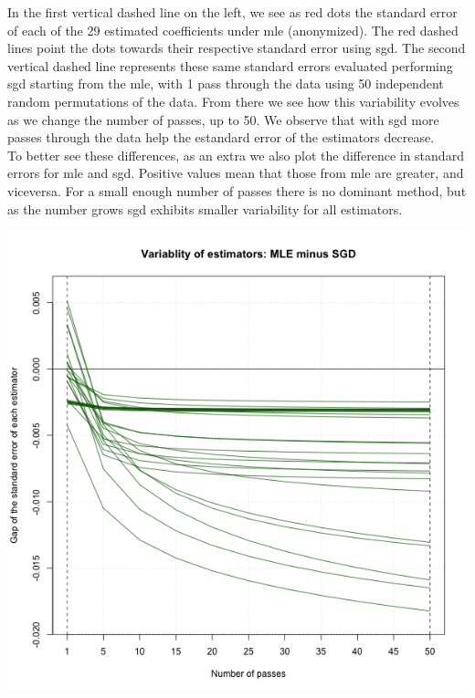 \documentclass[a4paper, 11pt]{article}
\begin{document}
In the first vertical dashed line on the left, we see as red dots the standard error of each of the 29 estimated coefficients under {\sc mle} (anonymized). The red dashed lines point the dots towards their respective standard error using {\sc sgd}. The second vertical dashed line represents these same standard errors evaluated performing {\sc sgd} starting from the {\sc mle}, with 1 pass through the data using 50 independent random permutations of the data. From there we see how this variability evolves as we change the number of passes, up to 50. We observe that with {\sc sgd} more passes through the data help the estandard error of the estimators decrease.\\
\newline To better see these differences, as an extra we also plot the difference in standard errors for {\sc mle} and {\sc sgd}. Positive values mean that those from {\sc mle} are greater, and viceversa. For a small enough number of passes there is no dominant method, but as the number grows {\sc sgd} exhibits smaller variability for all estimators.
\begin{center}
\includegraphics[scale=0.58]{plot_ex4_v2.png}\\
\end{center}
\end{document}
